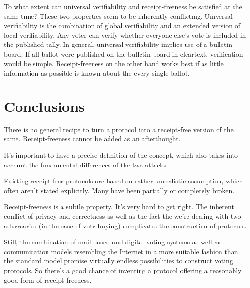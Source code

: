 \documentclass{article}
\begin{document}
To what extent can universal verifiability and receipt-freeness be satisfied at the same time? These two properties seem to be inherently conflicting. Universal verifiability is the combination of global verifiability and an extended version of local verifiability. Any voter can verify whether everyone else's vote is included in the published tally.
In general, universal verifiability implies use of a bulletin board. If all ballot were published on the bulletin board in cleartext, verification would be simple. Receipt-freeness on the other hand works best if as little information as possible is known about the every single ballot.



\section{Conclusions}
There is no general recipe to turn a protocol into a receipt-free version of the same. Receipt-freeness cannot be added as an afterthought.

It's important to have a precise definition of the concept, which also takes into account the fundamental differences of the two attacks.

Existing receipt-free protocols are based on rather unrealistic assumption, which often aren't stated explicitly. Many have been partially or completely broken.

Receipt-freeness is a subtle property. It's very hard to get right. The inherent conflict of privacy and correctness as well as the fact the we're dealing with two adversaries (in the case of vote-buying) complicates the construction of protocols.

Still, the combination of mail-based and digital voting systems as well as communication models resembling the Internet in a more suitable fashion than the standard model promise virtually endless possibilities to construct voting protocols. So there's a good chance of inventing a protocol offering a reasonably good form of receipt-freeness.

\end{document}
